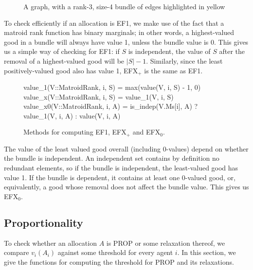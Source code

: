 \begin{figure}[ht!]
  \centering
\caption{A graph, with a rank-3, size-4 bundle of edges highlighted in yellow}
\label{fig:redundant-bundle}
\end{figure}

To check efficiently if an allocation is EF1, we make use of the fact that a matroid rank function has binary marginals; in other words, a highest-valued good in a bundle will always have value 1, unless the bundle value is 0. This gives us a simple way of checking for EF1: if $S$ is independent, the value of $S$ after the removal of a highest-valued good will be $|S|-1$. Similarly, since the least positively-valued good also has value 1, EFX$_+$ is the same as EF1.
\begin{figure}[ht!]
\begin{jllisting}
value_1(V::MatroidRank, i, S) = max(value(V, i, S) - 1, 0)
value_x(V::MatroidRank, i, S) = value_1(V, i, S)
value_x0(V::MatroidRank, i, A) =
    is_indep(V.Ms[i], A) ? value_1(V, i, A) : value(V, i, A)
\end{jllisting}
\caption{Methods for computing EF1, EFX$_+$ and EFX$_0$.}
\end{figure}

The value of the least valued good overall (including 0-values) depend on whether the bundle is independent. An independent set contains by definition no redundant elements, so if the bundle is independent, the least-valued good has value 1. If the bundle is dependent, it contains at least one 0-valued good, or, equivalently, a good whose removal does not affect the bundle value. This gives us EFX$_0$.

\subsection*{Proportionality}
To check whether an allocation $A$ is PROP or some relaxation thereof, we compare $v_i(A_i)$ against some threshold for every agent $i$. In this section, we give the functions for computing the threshold for PROP and its relaxations.

